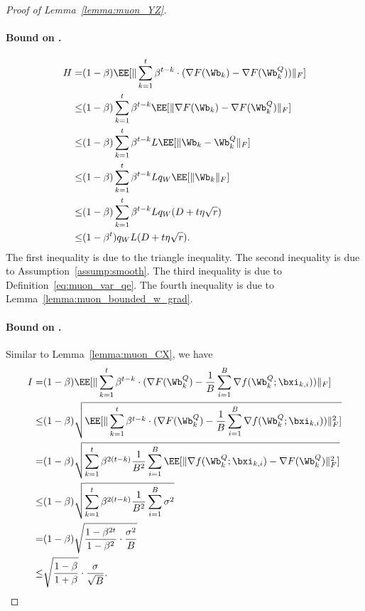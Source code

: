 \documentclass[11pt, letterpaper]{article}
\begin{document}
\begin{proof}[Proof of Lemma~\ref{lemma:muon_YZ}]
\paragraph{Bound on .}
\begin{align}\label{eq:muon_YZ_H}
    H
    =& (1-\beta)\EE[\|\sum_{k=1}^t\beta^{t-k}\cdot(\nabla F(\Wb_k) - \nabla F(\Wb_k^Q))\|_F] \notag \\
    \le& (1-\beta)\sum_{k=1}^t\beta^{t-k}\EE[\| \nabla F(\Wb_k) - \nabla F(\Wb_k^Q) \|_F] \notag \\
    \le& (1-\beta)\sum_{k=1}^t\beta^{t-k}L\EE[\| \Wb_k - \Wb_k^Q \|_F] \notag \\
    \le& (1-\beta)\sum_{k=1}^t\beta^{t-k}Lq_W\EE[\| \Wb_k \|_F] \notag \\
    \le& (1-\beta)\sum_{k=1}^t\beta^{t-k}Lq_W(D + t\eta\sqrt{r} ) \notag \\
    \le& (1-\beta^t)q_W L(D + t\eta\sqrt{r} ).
\end{align}
The first inequality is due to the triangle inequality. The second inequality is due to Assumption~\ref{assump:smooth}. The third inequality is due to Definition~\ref{eq:muon_var_qe}. The fourth inequality is due to Lemma~\ref{lemma:muon_bounded_w_grad}.


\paragraph{Bound on .}
Similar to Lemma~\ref{lemma:muon_CX}, we have
\begin{align}\label{eq:muon_YZ_I}
    I
    =& (1-\beta) \EE[\|\sum_{k=1}^t\beta^{t-k}\cdot(\nabla F(\Wb_k^Q) - \frac{1}{B}\sum_{i=1}^B\nabla f(\Wb_k^Q;\bxi_{k,i}) ) \|_F] \notag \\
    \le& (1-\beta) \sqrt{ \EE[\|\sum_{k=1}^t\beta^{t-k}\cdot(\nabla F(\Wb_k^Q) - \frac{1}{B}\sum_{i=1}^B\nabla f(\Wb_k^Q;\bxi_{k,i}) ) \|_F^2] } \notag \\
    =& (1-\beta) \sqrt{ \sum_{k=1}^t\beta^{2(t-k)}\frac{1}{B^2}\sum_{i=1}^B\EE[\|   \nabla f(\Wb_k^Q;\bxi_{k,i}) -\nabla F(\Wb_k^Q)  \|_F^2] } \notag \\
    \le& (1-\beta) \sqrt{ \sum_{k=1}^t\beta^{2(t-k)}\frac{1}{B^2}\sum_{i=1}^B \sigma^2 } \notag \\
    =& (1-\beta)\sqrt{\frac{1-\beta^{2t}}{1-\beta^2}\cdot\frac{\sigma^2}{B}} \notag \\
    \le& \sqrt{\frac{1-\beta}{1+\beta}}\cdot\frac{\sigma}{\sqrt{B}}.
\end{align}




\end{proof}
\end{document}
